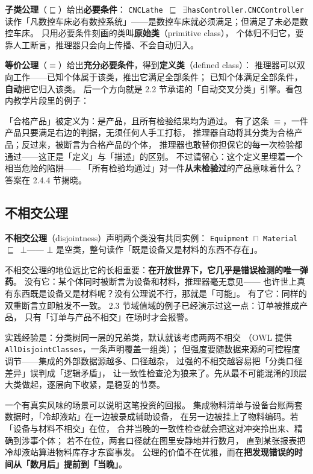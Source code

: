 \textbf{子类公理}（\(\sqsubseteq\)）给出\textbf{必要条件}：
\texttt{CNCLathe \(\sqsubseteq\) \(\exists\)hasController.CNCController}
读作「凡数控车床必有数控系统」——是数控车床就必须满足；但满足了未必是数控车床。
只用必要条件刻画的类叫\textbf{原始类}（primitive class），
个体归不归它，要靠人工断言，推理器只会向上传播、不会自动归入。

\textbf{等价公理}（\(\equiv\)）给出\textbf{充分必要条件}，得到\textbf{定义类}（defined class）：
推理器可以双向工作——已知个体属于该类，推出它满足全部条件；
已知个体满足全部条件，\textbf{自动}把它归入该类。
后一个方向就是 2.2 节承诺的「自动交叉分类」引擎。看包内教学片段里的例子：



「合格产品」被定义为：是产品，且所有检验结果均为通过。
有了这条 \(\equiv\)，一件产品只要满足右边的判据，无须任何人手工打标，
推理器自动将其分类为合格产品；反过来，被断言为合格产品的个体，
推理器也敢替你担保它的每一次检验都通过——这正是「定义」与「描述」的区别。
不过请留心：这个定义里埋着一个相当危险的陷阱——
「所有检验均通过」对一件\textbf{从未检验过}的产品意味着什么？答案在 2.4.4 节揭晓。

\subsection{不相交公理}

\textbf{不相交公理}（disjointness）声明两个类没有共同实例：
\texttt{Equipment \(\sqcap\) Material \(\sqsubseteq\) \(\bot\)}——
\(\bot\) 是空类，整句读作「既是设备又是材料的东西不存在」。

不相交公理的地位远比它的长相重要：\textbf{在开放世界下，它几乎是错误检测的唯一弹药}。
没有它：某个体同时被断言为设备和材料，推理器毫无意见——
也许世上真有东西既是设备又是材料呢？没有公理说不行，那就是「可能」。
有了它：同样的双重断言立即触发不一致。
2.3 节域值域的例子已经演示过这一点：订单被推成产品，
只有「订单与产品不相交」在场时才会报警。

实践经验是：分类树同一层的兄弟类，默认就该考虑两两不相交
（OWL 提供 \texttt{AllDisjoint\allowbreak Classes}，一条声明覆盖一组类）；
但强度要随数据来源的可控程度调节——集成的外部数据源越多、口径越杂，
过强的不相交越容易把「分类口径差异」误判成「逻辑矛盾」，
让一致性检查沦为狼来了。先从最不可能混淆的顶层大类做起，逐层向下收紧，是稳妥的节奏。

一个有真实风味的场景可以说明这笔投资的回报。
集成物料清单与设备台账两套数据时，「冷却液站」在一边被录成辅助设备，
在另一边被挂上了物料编码。若「设备与材料不相交」在位，
合并当晚的一致性检查就会把这对冲突拎出来、精确到涉事个体；
若不在位，两套口径就在图里安静地并行数月，
直到某张报表把冷却液站算进物料库存才东窗事发。
公理的价值不在优雅，而在\textbf{把发现错误的时间从「数月后」提前到「当晚」}。

